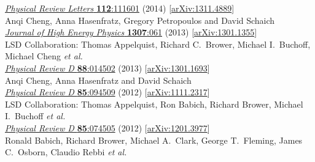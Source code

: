 \begin{spacelist}
\begin{revnumerate}
      \href{http://dx.doi.org/10.1103/PhysRevLett.112.111601}{\textit{Physical Review Letters} \textbf{112}:111601} (2014) [\href{http://arxiv.org/abs/1311.4889}{arXiv:1311.4889}]
    \pagebreakitem
       \\
      Anqi Cheng, Anna Hasenfratz, Gregory Petropoulos and David Schaich \\
      \href{http://dx.doi.org/10.1007/JHEP07(2013)061}{\textit{Journal of High Energy Physics} \textbf{1307}:061} (2013) [\href{http://arxiv.org/abs/1301.1355}{arXiv:1301.1355}]
    \pagebreakitem
       \\
      LSD Collaboration: Thomas Appelquist, Richard C.~Brower, Michael I.~Buchoff, Michael Cheng \textit{et al.} \\ %
      \href{http://dx.doi.org/10.1103/PhysRevD.88.014502}{\textit{Physical Review D} \textbf{88}:014502} (2013) [\href{http://arxiv.org/abs/1301.1693}{arXiv:1301.1693}]
    \pagebreakitem
       \\
      Anqi Cheng, Anna Hasenfratz and David Schaich \\
      \href{http://dx.doi.org/10.1103/PhysRevD.85.094509}{\textit{Physical Review D} \textbf{85}:094509} (2012) [\href{http://arxiv.org/abs/1111.2317}{arXiv:1111.2317}]
    \pagebreakitem
       \\
      LSD Collaboration: Thomas Appelquist, Ron Babich, Richard Brower, Michael I.~Buchoff \textit{et al.} \\ %
      \href{http://dx.doi.org/10.1103/PhysRevD.85.074505}{\textit{Physical Review D} \textbf{85}:074505} (2012) [\href{http://arxiv.org/abs/1201.3977}{arXiv:1201.3977}]
    \pagebreakitem
       \\
      Ronald Babich, Richard Brower, Michael A.~Clark, George T.~Fleming, James C.~Osborn, Claudio Rebbi \textit{et al.} \\ %

\end{revnumerate}
\end{spacelist}
